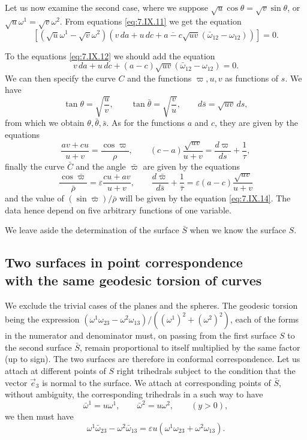 \documentclass[leqno,11pt]{book}
\numberwithin{equation}{chapter}
\theoremstyle{shape1}
\theoremstyle{shape0}
\theoremstyle{shape2}
\theoremstyle{definition}
\begin{document}
Let us now examine the second case, where we suppose $\sqrt{u}\cos\theta=\sqrt{v}\sin\theta$, or $\sqrt{u}\omega^{1}=\sqrt{v}\omega^{2}$. From equations \eqref{eq:7.IX.11} we get the equation
\[
[(\sqrt{u}\omega^{1}-\sqrt{v}\omega^{2})(v\,da+u\,dc+\overline{a-c}\sqrt{uv}(\bar\omega_{12}-\omega_{12}))]=0.
\]

To the equations \eqref{eq:7.IX.12} we should add the equation
\begin{equation}
  \label{eq:7.IX.14}\tag{IX, 14}
  v\,da+u\,dc+(a-c)\sqrt{uv}(\bar\omega_{12}-\omega_{12})=0.
\end{equation}
We can then specify the curve $C$ and the functions $\varpi,u,v$ as functions of $s$. We have
\[
\tan\theta=\sqrt{\frac{u}{v}},\qquad\tan\bar\theta=\sqrt{\frac{v}{u}},\qquad d\bar s=\sqrt{uv}\,ds,
\]
from which we obtain $\theta,\bar\theta,\bar s$. As for the functions $a$ and $c$, they are given by the equations
\[
\frac{av+cu}{u+v}=\frac{\cos\varpi}{\rho},\qquad(c-a)\frac{\sqrt{uv}}{u+v}=\frac{d\varpi}{ds}+\frac{1}{\tau},
\]
finally the curve $\bar C$ and the angle $\bar\varpi$ are given by the equations
\[
\frac{\cos\bar\varpi}{\bar\rho}=\varepsilon\frac{cu+av}{u+v},\qquad\frac{d\bar\varpi}{d\bar s}+\frac{1}{\bar\tau}=\varepsilon(a-c)\frac{\sqrt{uv}}{u+v}
\]
and the value of $(\sin\bar\varpi)/\bar\rho$ will be given by the equation \eqref{eq:7.IX.14}. The data hence depend on five arbitrary functions of one variable.

We leave aside the determination of the surface $\bar S$ when we know the surface $S$.


\subsection[{Two surfaces in point correspondence with the same geodesic torsion of curves}]{Two surfaces in point correspondence\\with the same geodesic torsion of curves}
\label{sec:some-surfaces-point-1}

\fsec We exclude the trivial cases  of the planes and the spheres. The geodesic torsion being the expression $(\omega^{1}\omega_{23}-\omega^{2}\omega_{13})/((\omega^{1})^{2}+(\omega^{2})^{2})$, each of the forms in the numerator and denominator must, on passing from the first surface $S$ to the second surface $\bar S$, remain proportional to itself multiplied by the same factor (up to sign). The two surfaces are therefore in conformal correspondence. Let us attach at different points of $S$ right trihedrals subject to the condition that the vector $\vec e_{3}$ is normal to the surface. We attach at corresponding points of $\bar S$, without ambiguity, the corresponding trihedrals in a such way to have
\[
\bar\omega^{1}=u\omega^{1},\qquad\bar\omega^{2}=u\omega^{2},\qquad(y>0),
\]
we then must have
\[
\omega^{1}\bar\omega_{23}-\omega^{2}\bar\omega_{13}=\varepsilon u(\omega^{1}\omega_{23}+\omega^{2}\omega_{13}).
\]
\end{document}
